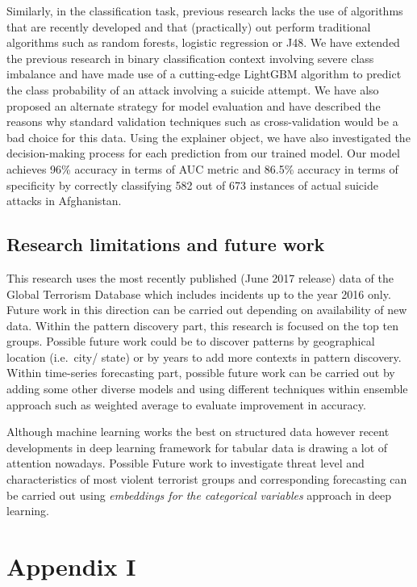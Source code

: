\documentclass[11pt,oneside,a4paper]{reedthesis}
\begin{document}
Similarly, in the classification task, previous research lacks the use
of algorithms that are recently developed and that (practically) out
perform traditional algorithms such as random forests, logistic
regression or J48. We have extended the previous research in binary
classification context involving severe class imbalance and have made
use of a cutting-edge LightGBM algorithm to predict the class
probability of an attack involving a suicide attempt. We have also
proposed an alternate strategy for model evaluation and have described
the reasons why standard validation techniques such as cross-validation
would be a bad choice for this data. Using the explainer object, we have
also investigated the decision-making process for each prediction from
our trained model. Our model achieves 96\% accuracy in terms of AUC
metric and 86.5\% accuracy in terms of specificity by correctly
classifying 582 out of 673 instances of actual suicide attacks in
Afghanistan.

\section{Research limitations and future
work}\label{research-limitations-and-future-work}

This research uses the most recently published (June 2017 release) data
of the Global Terrorism Database which includes incidents up to the year
2016 only. Future work in this direction can be carried out depending on
availability of new data. Within the pattern discovery part, this
research is focused on the top ten groups. Possible future work could be
to discover patterns by geographical location (i.e.~city/ state) or by
years to add more contexts in pattern discovery. Within time-series
forecasting part, possible future work can be carried out by adding some
other diverse models and using different techniques within ensemble
approach such as weighted average to evaluate improvement in accuracy.

Although machine learning works the best on structured data however
recent developments in deep learning framework for tabular data is
drawing a lot of attention nowadays. Possible Future work to investigate
threat level and characteristics of most violent terrorist groups and
corresponding forecasting can be carried out using \emph{embeddings for
the categorical variables} approach in deep learning.

\appendix

\hypertarget{appendix-i}{\chapter{Appendix I}\label{appendix-i}}
\end{document}
